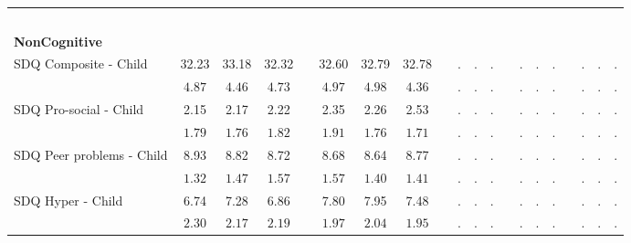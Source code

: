 \begin{center}
{\begin{longtable}{L{5cm} c c c p{.5cm} c c c p{.5cm} c c c p{.5cm} c c c p{.5cm} c c c}
 ~\\[-.5em]
\textbf{NonCognitive} \\[.6em]
 \quad SDQ Composite - Child & 32.23 &     33.18 &     32.32 & &     32.60 &     32.79 &     32.78 & &         . &         . &         . & &         . &         . &         . & &         . &         . &         . \\*
 \quad & $\mathit{     4.87}$ & $\mathit{     4.46}$ & $\mathit{     4.73}$ & & $\mathit{     4.97}$ & $\mathit{     4.98}$ & $\mathit{     4.36}$ & & $\mathit{        .}$ & $\mathit{        .}$ & $\mathit{        .}$ & & $\mathit{        .}$ & $\mathit{        .}$ & $\mathit{        .}$ & & $\mathit{        .}$ & $\mathit{        .}$ & $\mathit{        .}$ \\[.2em]
 \quad SDQ Pro-social - Child & 2.15 &      2.17 &      2.22 & &      2.35 &      2.26 &      2.53 & &         . &         . &         . & &         . &         . &         . & &         . &         . &         . \\*
 \quad & $\mathit{     1.79}$ & $\mathit{     1.76}$ & $\mathit{     1.82}$ & & $\mathit{     1.91}$ & $\mathit{     1.76}$ & $\mathit{     1.71}$ & & $\mathit{        .}$ & $\mathit{        .}$ & $\mathit{        .}$ & & $\mathit{        .}$ & $\mathit{        .}$ & $\mathit{        .}$ & & $\mathit{        .}$ & $\mathit{        .}$ & $\mathit{        .}$ \\[.2em]
 \quad SDQ Peer problems - Child & 8.93 &      8.82 &      8.72 & &      8.68 &      8.64 &      8.77 & &         . &         . &         . & &         . &         . &         . & &         . &         . &         . \\*
 \quad & $\mathit{     1.32}$ & $\mathit{     1.47}$ & $\mathit{     1.57}$ & & $\mathit{     1.57}$ & $\mathit{     1.40}$ & $\mathit{     1.41}$ & & $\mathit{        .}$ & $\mathit{        .}$ & $\mathit{        .}$ & & $\mathit{        .}$ & $\mathit{        .}$ & $\mathit{        .}$ & & $\mathit{        .}$ & $\mathit{        .}$ & $\mathit{        .}$ \\[.2em]
 \quad SDQ Hyper - Child & 6.74 &      7.28 &      6.86 & &      7.80 &      7.95 &      7.48 & &         . &         . &         . & &         . &         . &         . & &         . &         . &         . \\*
 \quad & $\mathit{     2.30}$ & $\mathit{     2.17}$ & $\mathit{     2.19}$ & & $\mathit{     1.97}$ & $\mathit{     2.04}$ & $\mathit{     1.95}$ & & $\mathit{        .}$ & $\mathit{        .}$ & $\mathit{        .}$ & & $\mathit{        .}$ & $\mathit{        .}$ & $\mathit{        .}$ & & $\mathit{        .}$ & $\mathit{        .}$ & $\mathit{        .}$ \\[.2em]

\end{longtable}}
\end{center}
